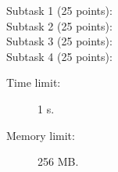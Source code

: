\documentclass{boi2014}
\begin{document}
    \Scoring

    \begin{description}
        \item[Subtask 1 (25 points):]
        \item[Subtask 2 (25 points):]
        \item[Subtask 3 (25 points):]
        \item[Subtask 4 (25 points):]
    \end{description}

    \Constraints

    \begin{description}
        \item[Time limit:] 1 s.
        \item[Memory limit:] 256 MB.
    \end{description}

\end{document}
